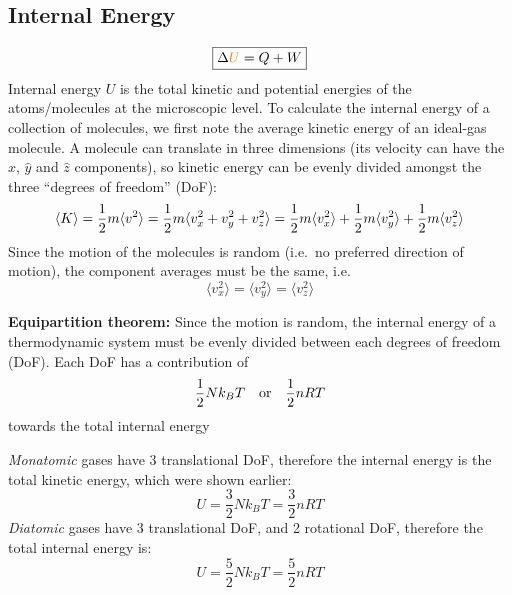 \subsection{Internal Energy}
{\large
  \begin{equation*}
    \boxed{
      \Delta{\color{orange}U}=Q+W
    }
  \end{equation*}
}
Internal energy {\color{orange}$U$} is the total kinetic and potential energies
of the atoms/molecules at the microscopic level. To calculate the internal
energy of a collection of molecules, we first note the average kinetic energy
of an ideal-gas molecule. A molecule can translate in three dimensions (its
velocity can have the $\hat x$, $\hat y$ and $\hat z$ components), so kinetic
energy can be evenly divided amongst the three ``degrees of freedom'' (DoF):
\begin{equation*}
  \langle K \rangle=\frac12m\langle v^2\rangle
  =\frac12m\langle v_x^2+v_y^2+v_z^2\rangle\\
  =\frac12m\langle v_x^2\rangle+\frac12m\langle v_y^2\rangle+
  \frac12m\langle v_z^2\rangle
\end{equation*}
Since the motion of the molecules is random (i.e.\ no preferred direction of
motion), the component averages must be the same, i.e.
\begin{equation}
  \langle v_x^2\rangle=\langle v_y^2\rangle=\langle v_z^2\rangle
\end{equation}

\begin{definition}
  \textbf{Equipartition theorem:} Since the motion is random, the internal
  energy of a thermodynamic system must be evenly divided between each degrees
  of freedom (DoF). Each DoF has a contribution of
  \begin{equation*}
    \frac12Nk_BT\quad\text{\normalsize or}\quad\frac12nRT
  \end{equation*}
  towards the total internal energy
\end{definition}

\emph{Monatomic} gases have 3 translational DoF, therefore the internal
energy is the total kinetic energy, which were shown earlier:
\begin{equation}
  U=\frac32Nk_BT=\frac32nRT
\end{equation}
%
\emph{Diatomic} gases
have 3 translational DoF, and 2 rotational DoF, therefore the total internal
energy is:
\begin{equation}
  U=\frac52Nk_BT=\frac52nRT
\end{equation}

